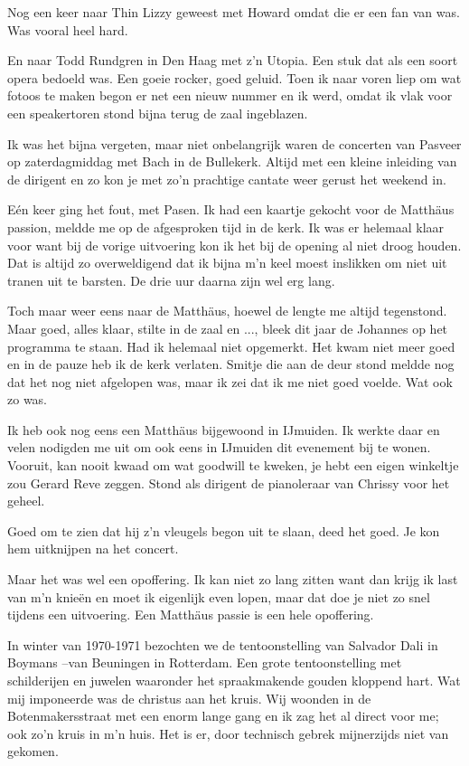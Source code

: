 \documentclass[12pt,twoside]{memoir}
\begin{document}
Nog een keer naar Thin Lizzy geweest met Howard omdat die er een fan van was. Was vooral heel hard. 

En naar Todd Rundgren in Den Haag met z’n Utopia. Een stuk dat als een soort opera bedoeld was. Een goeie rocker, goed geluid. Toen ik naar voren liep om wat fotoos te maken begon er net een nieuw nummer en ik werd, omdat ik vlak voor een speakertoren stond bijna terug de zaal ingeblazen.

Ik was het bijna vergeten, maar niet onbelangrijk waren de concerten van Pasveer op zaterdagmiddag met Bach in de Bullekerk. Altijd met een kleine inleiding van de dirigent en zo kon je met zo’n prachtige cantate weer gerust het weekend in.

Eén keer ging het fout, met Pasen. Ik had een kaartje gekocht voor de Matthäus passion, meldde me op de afgesproken tijd in de kerk. Ik was er helemaal klaar voor want bij de vorige uitvoering kon ik het bij de opening al niet droog houden. Dat is altijd zo overweldigend dat ik bijna m’n keel moest inslikken om niet uit tranen uit te barsten. De drie uur daarna zijn wel erg lang. 

Toch maar weer eens naar de Matthäus, hoewel de lengte me altijd tegenstond. Maar goed, alles klaar, stilte in de zaal en ..., bleek dit jaar de Johannes op het programma te staan. Had ik helemaal niet opgemerkt. Het kwam niet meer goed en in de pauze heb ik de kerk verlaten. Smitje die aan de deur stond meldde nog dat het nog niet afgelopen was, maar ik zei dat ik me niet goed voelde. Wat ook zo was.

Ik heb ook nog eens een Matthäus bijgewoond in IJmuiden. Ik werkte daar en velen nodigden me uit om ook eens in IJmuiden dit evenement bij te wonen. Vooruit, kan nooit kwaad om wat goodwill te kweken, je hebt een eigen winkeltje zou Gerard Reve zeggen. Stond als dirigent de pianoleraar van Chrissy voor het geheel. 

Goed om te zien dat hij z’n vleugels begon uit te slaan, deed het goed. Je kon hem uitknijpen na het concert.  

Maar het was wel een opoffering. Ik kan niet zo lang zitten want dan krijg ik last van m’n knieën en moet ik eigenlijk even lopen, maar dat doe je niet zo snel tijdens een uitvoering. Een Matthäus passie is een hele opoffering.

In winter van 1970-1971 bezochten we de tentoonstelling van Salvador Dali in Boymans –van Beuningen in Rotterdam. Een grote tentoonstelling met schilderijen en juwelen waaronder het spraakmakende gouden kloppend hart. Wat mij imponeerde was de christus aan het kruis. Wij woonden in de Botenmakersstraat met een enorm lange gang en ik zag het al direct voor me; ook zo’n kruis in m’n huis. Het is er, door technisch gebrek mijnerzijds niet van gekomen.
\end{document}
